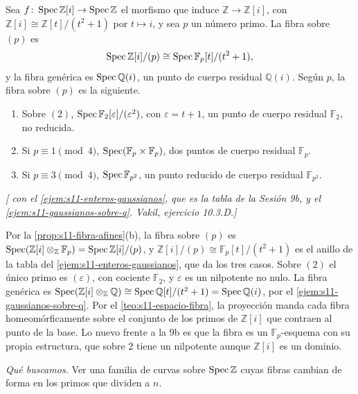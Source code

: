\begin{ejem}
\label{ejem:s11-fibras-gaussianos}
Sea \(f\colon\operatorname{Spec}\mathbb Z[i]\to\operatorname{Spec}\mathbb Z\) el morfismo que induce \(\mathbb Z\to\mathbb Z[i]\), con \(\mathbb Z[i]\cong\mathbb Z[t]/(t^2+1)\) por \(t\mapsto i\), y sea \(p\) un número primo. La fibra sobre \((p)\) es
\[
 \operatorname{Spec}\mathbb Z[i]/(p)\cong\operatorname{Spec}\mathbb F_p[t]/(t^2+1),
\]
y la fibra genérica es \(\operatorname{Spec}\mathbb Q(i)\), un punto de cuerpo residual \(\mathbb Q(i)\). Según \(p\), la fibra sobre \((p)\) es la siguiente.
\begin{enumerate}[label=(\alph*)]
\item Sobre \((2)\), \(\operatorname{Spec}\mathbb F_2[\varepsilon]/(\varepsilon^2)\), con \(\varepsilon=t+1\), un punto de cuerpo residual \(\mathbb F_2\), no reducida.
\item Si \(p\equiv1\pmod4\), \(\operatorname{Spec}(\mathbb F_p\times\mathbb F_p)\), dos puntos de cuerpo residual \(\mathbb F_p\).
\item Si \(p\equiv3\pmod4\), \(\operatorname{Spec}\mathbb F_{p^2}\), un punto reducido de cuerpo residual \(\mathbb F_{p^2}\).
\end{enumerate}
\emph{[ con el \cref{ejem:s11-enteros-gaussianos}, que es la tabla de la Sesión 9b, y el \cref{ejem:s11-gaussianos-sobre-q}. Vakil, ejercicio 10.3.D.]}
\end{ejem}

Por la \cref{prop:s11-fibra-afines}(b), la fibra sobre \((p)\) es \(\operatorname{Spec}(\mathbb Z[i]\otimes_{\mathbb Z}\mathbb F_p)=\operatorname{Spec}\mathbb Z[i]/(p)\), y \(\mathbb Z[i]/(p)\cong\mathbb F_p[t]/(t^2+1)\) es el anillo de la tabla del \cref{ejem:s11-enteros-gaussianos}, que da los tres casos. Sobre \((2)\) el único primo es \((\varepsilon)\), con cociente \(\mathbb F_2\), y \(\varepsilon\) es un nilpotente no nulo. La fibra genérica es \(\operatorname{Spec}(\mathbb Z[i]\otimes_{\mathbb Z}\mathbb Q)\cong\operatorname{Spec}\mathbb Q[t]/(t^2+1)=\operatorname{Spec}\mathbb Q(i)\), por el \cref{ejem:s11-gaussianos-sobre-q}. Por el \cref{teo:s11-espacio-fibra}, la proyección manda cada fibra homeomórficamente sobre el conjunto de los primos de \(\mathbb Z[i]\) que contraen al punto de la base. Lo nuevo frente a la 9b es que la fibra es un \(\mathbb F_p\)-esquema con su propia estructura, que sobre \(2\) tiene un nilpotente aunque \(\mathbb Z[i]\) es un dominio.

\emph{Qué buscamos.} Ver una familia de curvas sobre \(\operatorname{Spec}\mathbb Z\) cuyas fibras cambian de forma en los primos que dividen a \(n\).

